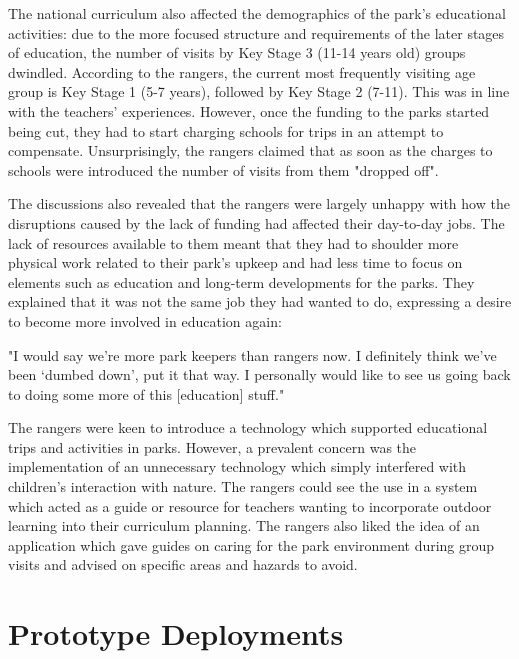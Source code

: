 The national curriculum also affected the demographics of the park’s educational activities: due to the more focused structure and requirements of the later stages of education, the number of visits by Key Stage 3 (11-14 years old) groups dwindled. According to the rangers, the current most frequently visiting age group is Key Stage 1 (5-7 years), followed by Key Stage 2 (7-11). This was in line with the teachers’ experiences. However, once the funding to the parks started being cut, they had to start charging schools for trips in an attempt to compensate. Unsurprisingly, the rangers claimed that as soon as the charges to schools were introduced the number of visits from them "dropped off".

The discussions also revealed that the rangers were largely unhappy with how the disruptions caused by the lack of funding had affected their day-to-day jobs. The lack of resources available to them meant that they had to shoulder more physical work related to their park’s upkeep and had less time to focus on elements such as education and long-term developments for the parks. They explained that it was not the same job they had wanted to do, expressing a desire to become more involved in education again:

\begin{displayquote}
"I would say we're more park keepers than rangers now. I definitely think we've been `dumbed down', put it that way. I personally would like to see us going back to doing some more of this [education] stuff."
\end{displayquote}

The rangers were keen to introduce a technology which supported educational trips and activities in parks. However, a prevalent concern was the implementation of an unnecessary technology which simply interfered with children’s interaction with nature. The rangers could see the use in a system which acted as a guide or resource for teachers wanting to incorporate outdoor learning into their curriculum planning. The rangers also liked the idea of an application which gave guides on caring for the park environment during group visits and advised on specific areas and hazards to avoid.

\section{Prototype Deployments}

